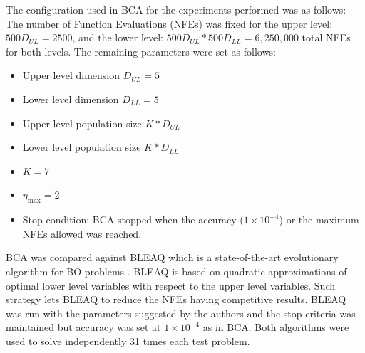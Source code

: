 \documentclass[conference]{IEEEtran}
\begin{document}
The configuration used in BCA for the experiments performed was as follows:
% 
% 
The number of Function Evaluations (NFEs) was fixed for the upper level: $500D_{UL} = 2500$, 
and the lower level: $500D_{UL}*500D_{LL} = 6,250,000$ total NFEs for both levels.
The remaining parameters were set as follows:
\begin{itemize}
    \item Upper level dimension $D_{UL} = 5$
    \item Lower level dimension $D_{LL} = 5$
    \item Upper level population size $K*D_{UL}$
    \item Lower level population size $K*D_{LL}$
    \item $K = 7$
    \item $\eta_{\max} = 2$
    \item Stop condition: BCA stopped when the accuracy ($1\times 10^{-4}$) or
    the maximum NFEs allowed was reached.
\end{itemize}


BCA was compared against BLEAQ which is a state-of-the-art evolutionary algorithm
for BO problems \cite{sinha2018review,sinha2013efficient}. BLEAQ is based on quadratic
approximations of optimal lower level variables with respect to the upper level
variables. Such strategy lets BLEAQ to reduce the NFEs having competitive results.
BLEAQ was run with the parameters suggested by the authors \cite{sinha2018review,sinha2013efficient}
and the stop criteria was maintained but accuracy was set at $1\times 10^{-4}$ as
in BCA. Both algorithms were used to solve independently 31 times each test problem.
\end{document}
